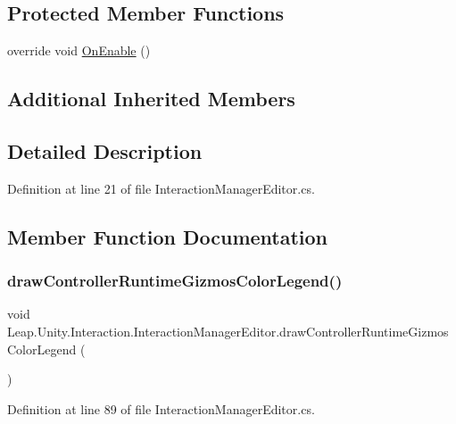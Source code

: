 \subsection*{Protected Member Functions}
\begin{DoxyCompactItemize}
\item 
override void \mbox{\hyperlink{class_leap_1_1_unity_1_1_interaction_1_1_interaction_manager_editor_a98a39c4b467e4b97d93f012753141fc1}{On\+Enable}} ()
\end{DoxyCompactItemize}
\subsection*{Additional Inherited Members}


\subsection{Detailed Description}


Definition at line 21 of file Interaction\+Manager\+Editor.\+cs.



\subsection{Member Function Documentation}
\mbox{\label{class_leap_1_1_unity_1_1_interaction_1_1_interaction_manager_editor_a58578d667041a887d24fd2581df9d335}} 
\subsubsection{\texorpdfstring{drawControllerRuntimeGizmosColorLegend()}{drawControllerRuntimeGizmosColorLegend()}}
{\footnotesize\ttfamily void Leap.\+Unity.\+Interaction.\+Interaction\+Manager\+Editor.\+draw\+Controller\+Runtime\+Gizmos\+Color\+Legend (\begin{DoxyParamCaption}{ }\end{DoxyParamCaption})}



Definition at line 89 of file Interaction\+Manager\+Editor.\+cs.

